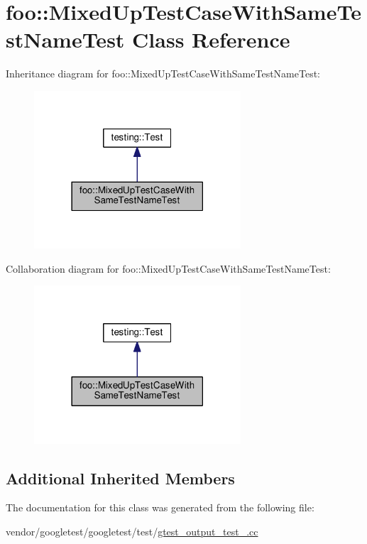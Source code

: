 \hypertarget{classfoo_1_1MixedUpTestCaseWithSameTestNameTest}{}\section{foo\+:\+:Mixed\+Up\+Test\+Case\+With\+Same\+Test\+Name\+Test Class Reference}
\label{classfoo_1_1MixedUpTestCaseWithSameTestNameTest}


Inheritance diagram for foo\+:\+:Mixed\+Up\+Test\+Case\+With\+Same\+Test\+Name\+Test\+:
\nopagebreak
\begin{figure}[H]
\begin{center}
\leavevmode
\includegraphics[width=218pt]{classfoo_1_1MixedUpTestCaseWithSameTestNameTest__inherit__graph}
\end{center}
\end{figure}


Collaboration diagram for foo\+:\+:Mixed\+Up\+Test\+Case\+With\+Same\+Test\+Name\+Test\+:
\nopagebreak
\begin{figure}[H]
\begin{center}
\leavevmode
\includegraphics[width=218pt]{classfoo_1_1MixedUpTestCaseWithSameTestNameTest__coll__graph}
\end{center}
\end{figure}
\subsection*{Additional Inherited Members}


The documentation for this class was generated from the following file\+:\begin{DoxyCompactItemize}
\item 
vendor/googletest/googletest/test/\hyperlink{gtest__output__test___8cc}{gtest\+\_\+output\+\_\+test\+\_\+.\+cc}\end{DoxyCompactItemize}

